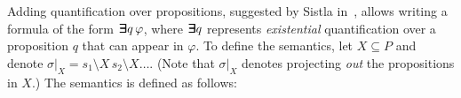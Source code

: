 
\vspace{1.2ex}
Adding quantification over propositions, suggested by Sistla in~\cite{sistla-phd-83}, allows writing a formula of the form
$\bm{\exists}\kern-0.6em\bm{\exists} q \, \varphi$, where
$\bm{\exists}\kern-0.6em\bm{\exists} q$ represents {\em existential} quantification over a proposition $q$ that can appear in $\varphi$.
%
To define the semantics, let $X \subseteq P$ 
and denote $\sigma |_X = s_1 \setminus X \, s_2 \setminus X \ldots$. (Note that $\sigma |_X$ denotes projecting {\em out} the propositions in $X$.) The semantics is defined as follows:

